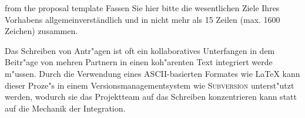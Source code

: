 \begin{Zusammenfassung}
\begin{todo}{from the proposal template}
  Fassen Sie hier bitte die wesentlichen Ziele Ihres Vorhabens allgemeinverständlich und
  in nicht mehr als 15 Zeilen (max. 1600 Zeichen) zusammen.
\end{todo}
Das Schreiben von Antr"agen ist oft ein kollaboratives Unterfangen in dem Beitr"age von
mehren Partnern in einen koh"arenten Text integriert werde m"ussen. Durch die Verwendung
eines ASCII-basierten Formates wie {\LaTeX} kann dieser Proze"s in einem
Versionsmanagementsystem wie {\textsc{Subversion}} unterst"utzt werden, wodurch sie das
Projektteam auf das Schreiben konzentrieren kann statt auf die Mechanik der Integration.
\end{Zusammenfassung}

